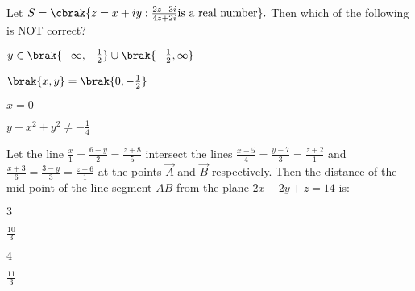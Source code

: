 \item Let $S = \cbrak{z = x + iy : \frac{2z-3i}{4z+2i} \text{is a real number}}.$ Then which of the following is NOT correct?
        	\begin{enumerate}
	\end{enumerate}
\item Let the line $\frac{x}{1} = \frac{6-y}{2} =\frac{z+8}{5}$ intersect the lines $\frac{x-5}{4} = \frac{y-7}{3} = \frac{z+2}{1}$ and $\frac{x+3}{6} = \frac{3-y}{3} = \frac{z-6}{1}$ at the points $\vec{A}$ and $\vec{B}$ respectively. Then the distance of the mid-point of the line segment $AB$ from the plane $2x - 2y + z = 14$ is:
	\begin{enumerate}
			\begin{multicols}{4}
			\item $3$
			\item $\frac{10}{3}$
			\item $4$
			\item $\frac{11}{3}$
			\end{multicols}
	\end{enumerate}

